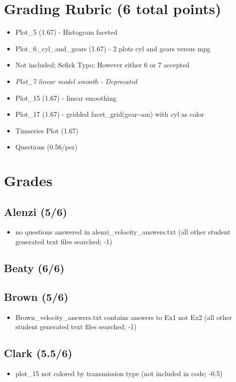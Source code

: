 \documentclass[11pt]{article}
\author{Stephen Sefick}
\date{\today}
\title{}
\begin{document}
\tableofcontents

\section{Grading Rubric (6 total points)}
\label{sec:orgheadline1}
\begin{itemize}
\item Plot\_5 (1.67) - Histogram faceted
\item Plot\_6\_cyl\_and\_gears (1.67) - 2 plots cyl and gears versus mpg
\item Not included; Sefick Typo; However either 6 or 7 accepted
\item \emph{Plot\_7 linear model smooth - Deprecated}
\item Plot\_15 (1.67) - linear smoothing
\item Plot\_17 (1.67) - gridded facet\_grid(gear\textasciitilde{}am) with cyl as color
\item Timseries Plot (1.67)
\item Questions (0.56/per)
\end{itemize}
\section{Grades}
\label{sec:orgheadline22}
\subsection{Alenzi (5/6)}
\label{sec:orgheadline2}
\begin{itemize}
\item no questions answered in alenzi\_velocity\_answers.txt (all other student generated text files searched; -1)
\end{itemize}
\subsection{Beaty (6/6)}
\label{sec:orgheadline3}
\subsection{Brown (5/6)}
\label{sec:orgheadline4}
\begin{itemize}
\item Brown\_velocity\_answers.txt contains answers to Ex1 not Ex2 (all other student generated text files searched; -1)
\end{itemize}
\subsection{Clark (5.5/6)}
\label{sec:orgheadline5}
\begin{itemize}
\item plot\_15 not colored by transmission type (not included in code; -0.5)
\end{itemize}
\end{document}
